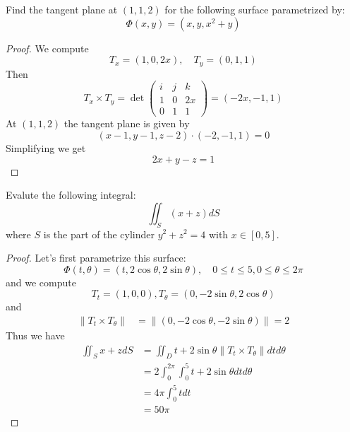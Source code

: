 \documentclass[openany]{book}
\begin{document}
\begin{prob}
    Find the tangent plane at $(1,1,2)$ for the following surface parametrized by:
    \begin{equation*}
        \Phi(x,y)=(x,y, x^2+y)
    \end{equation*}
\end{prob}
\begin{proof}
    We compute 
    \begin{equation*}
        T_x=(1, 0, 2x), \quad T_y=(0,1, 1)
    \end{equation*}
    Then 
    \begin{equation*}
        T_x\times T_y=\det\begin{pmatrix}
            i&j&k\\
            1&0&2x\\
            0&1&1
        \end{pmatrix}=(-2x, -1, 1)
    \end{equation*}
    At $(1,1,2)$ the tangent plane is given by 
    \begin{equation*}
        (x-1, y-1, z-2)\cdot (-2, -1, 1)=0
    \end{equation*}
    Simplifying we get 
    \begin{equation*}
        2x+y-z=1
    \end{equation*}
\end{proof}



\begin{prob}
    Evalute the following integral:
    \begin{equation*}
        \iint_S(x+z)dS
    \end{equation*}
    where $S$ is the part of the cylinder $y^2+z^2=4$ with $x\in [0,5]$.
\end{prob}
\begin{proof}
    Let's first parametrize this surface:
    \begin{equation*}
        \Phi(t,\theta)=(t, 2\cos\theta, 2\sin\theta), \quad 0\leq t\leq 5, 0\leq\theta\leq 2\pi
    \end{equation*}
    and we compute 
    \begin{equation*}
        T_t=(1, 0, 0), T_\theta=(0, -2\sin\theta, 2\cos\theta)
    \end{equation*}
    and 
    \begin{align*}
        \|T_t\times T_\theta\|&=\|(0, -2\cos\theta, -2\sin\theta)\|=2
    \end{align*}
    Thus we have 
    \begin{align*}
        \iint_Sx+zdS&=\iint_Dt+2\sin\theta\|T_t\times T_\theta\|dtd\theta\\
        &=2\int_0^{2\pi}\int_0^5t+2\sin\theta dtd\theta\\
        &=4\pi\int_0^5tdt\\
        &=50\pi
    \end{align*}
\end{proof}




\end{document}
